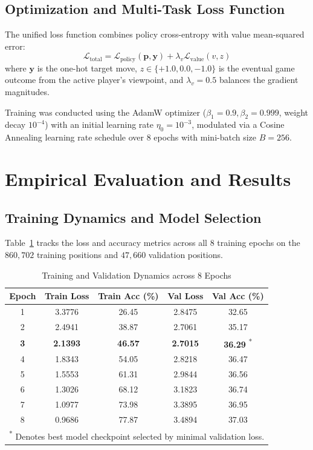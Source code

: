 \documentclass[10pt,journal,compsoc]{IEEEtran}
\begin{document}
\subsection{Optimization and Multi-Task Loss Function}
The unified loss function combines policy cross-entropy with value mean-squared error:
\begin{equation}
\mathcal{L}_{\text{total}} = \mathcal{L}_{\text{policy}}(\mathbf{p}, \mathbf{y}) + \lambda_v \mathcal{L}_{\text{value}}(v, z)
\end{equation}
where $\mathbf{y}$ is the one-hot target move, $z \in \{+1.0, 0.0, -1.0\}$ is the eventual game outcome from the active player's viewpoint, and $\lambda_v = 0.5$ balances the gradient magnitudes.

Training was conducted using the AdamW optimizer ($\beta_1 = 0.9, \beta_2 = 0.999$, weight decay $10^{-4}$) with an initial learning rate $\eta_0 = 10^{-3}$, modulated via a Cosine Annealing learning rate schedule over 8 epochs with mini-batch size $B = 256$.

\section{Empirical Evaluation and Results}
\label{sec:results}

\subsection{Training Dynamics and Model Selection}
Table~\ref{tab:training_dynamics} tracks the loss and accuracy metrics across all 8 training epochs on the $860,702$ training positions and $47,660$ validation positions.

\begin{table}[htbp]
\centering
\caption{Training and Validation Dynamics across 8 Epochs}
\label{tab:training_dynamics}
\begin{tabular}{ccccc}
\toprule
\textbf{Epoch} & \textbf{Train Loss} & \textbf{Train Acc (\%)} & \textbf{Val Loss} & \textbf{Val Acc (\%)} \\
\midrule
1 & 3.3776 & 26.45 & 2.8475 & 32.65 \\
2 & 2.4941 & 38.87 & 2.7061 & 35.17 \\
\textbf{3} & \textbf{2.1393} & \textbf{46.57} & \textbf{2.7015} & \textbf{36.29} \textsuperscript{*} \\
4 & 1.8343 & 54.05 & 2.8218 & 36.47 \\
5 & 1.5553 & 61.31 & 2.9844 & 36.56 \\
6 & 1.3026 & 68.12 & 3.1823 & 36.74 \\
7 & 1.0977 & 73.98 & 3.3895 & 36.95 \\
8 & 0.9686 & 77.87 & 3.4894 & 37.03 \\
\bottomrule
\multicolumn{5}{l}{\scriptsize \textsuperscript{*} Denotes best model checkpoint selected by minimal validation loss.}
\end{tabular}
\end{table}
\end{document}
